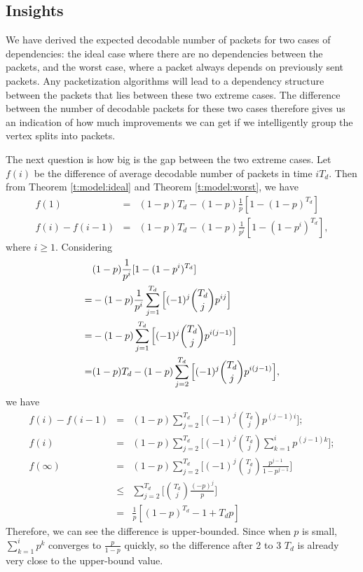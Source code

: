 \subsection{Insights}
    We have derived the expected decodable number of packets for
    two cases of dependencies: the ideal case where there are no
    dependencies between the packets, and the worst case, where
    a packet always depends on previously sent packets.  Any
    packetization algorithms will lead to a
    dependency structure between the packets that lies between
    these two extreme cases.  The difference between the number of
    decodable packets for these two cases therefore gives us an
    indication of how much improvements we can get if we intelligently
    group the vertex splits into packets.  
    
    The next question is how big is the
    gap between the two extreme cases.
    Let $f(i)$ be the difference of average decodable number of packets in time $iT_d$. Then
    from Theorem \ref{t:model:ideal} and Theorem \ref{t:model:worst}, we have
    \begin{eqnarray*}
    f(1)         &=& (1-p)T_d - (1-p)\frac{1}{p}[1-(1-p)^{T_d}]\\
        f(i)-f(i-1)  &=& (1-p)T_d - (1-p)\frac{1}{p^i}[1-(1-p^i)^{T_d}],
    \end{eqnarray*}
    where $i \geq 1$. Considering 
    \begin{eqnarray*}
        &(1-p)\dfrac{1}{p^i}[1-(1 - p^i)^{T_d}]\\
        =&-(1-p)\dfrac{1}{p^i}\displaystyle\sum_{j=1}^{T_d}\Big[(-1)^j\dbinom{T_d}{j}p^{ij}\Big]\\
        =&-(1-p)\displaystyle\sum_{j=1}^{T_d}\Big[(-1)^j\dbinom{T_d}{j}p^{i(j-1)}\Big]\\
        =& (1-p)T_d - (1-p)\displaystyle\sum_{j=2}^{T_d}\Big[(-1)^j\dbinom{T_d}{j}p^{i(j-1)}\Big],
    \end{eqnarray*}
    we have
    \begin{eqnarray*}
    f(i) - f(i-1) &=& (1-p)\sum_{j=2}^{T_d}\Big[(-1)^j\binom{T_d}{j}p^{(j-1)i}\Big];\\
    f(i)          &=& (1-p)\sum_{j=2}^{T_d}\Big[(-1)^{j}\binom{T_d}{j}\sum_{k=1}^i p^{(j - 1)k}\Big];\\
    f(\infty)     &=& (1-p)\sum_{j=2}^{T_d}\Big[(-1)^{j}\binom{T_d}{j}\frac{p^{j-1}}{1-p^{j-1}}\Big]\\
                  &\leq& \sum_{j=2}^{T_d}\Big[\binom{T_d}{j}\frac{(-p)^{j}}{p}\Big]\\ 
                  &=& \frac{1}{p}[(1 - p)^{T_d} - 1 + T_{d}p]
    \end{eqnarray*}
    Therefore, we can see the difference is upper-bounded.
    Since when $p$ is small, $\sum_{k=1}^i p^k$ converges to $\frac{p}{1-p}$ quickly,
    so the difference after 2 to 3 $T_d$ is already very close to the upper-bound value.
    
